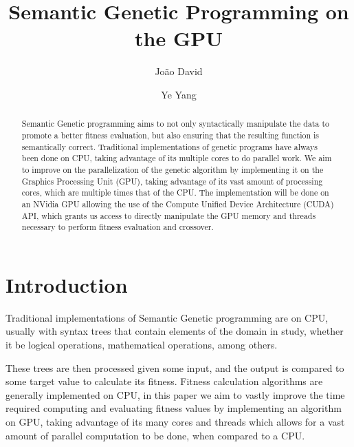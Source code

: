 \documentclass[runningheads]{llncs}
\begin{document}
\title{Semantic Genetic Programming on the GPU}
\author{João David \and
Ye Yang
}


\maketitle

\begin{abstract}
Semantic Genetic programming aims to not only syntactically manipulate the data to promote a better fitness evaluation, but also ensuring that the resulting function is semantically correct. Traditional implementations of genetic programs have always been done on CPU, taking advantage of its multiple cores to do parallel work. We aim to improve on the parallelization of the genetic algorithm by implementing it on the Graphics Processing Unit (GPU), taking advantage of its vast amount of processing cores, which are multiple times that of the CPU. The implementation will be done on an NVidia GPU allowing the use of the Compute Unified Device Architecture (CUDA) API, which grants us access to directly manipulate the GPU memory and threads necessary to perform fitness evaluation and crossover.

\end{abstract}
%
%
%
\section{Introduction}

Traditional implementations of Semantic Genetic programming are  on CPU, usually with syntax trees that contain elements of the domain in study, whether it be logical operations, mathematical operations, among others.

These trees are then processed given some input, and the output is compared to some target value to calculate its fitness. Fitness calculation algorithms are generally implemented on CPU, in this paper we aim to vastly improve the time required computing and evaluating fitness values by implementing an algorithm on GPU, taking advantage of its many cores and threads which allows for a vast amount of parallel computation to be done, when compared to a CPU.
\end{document}
